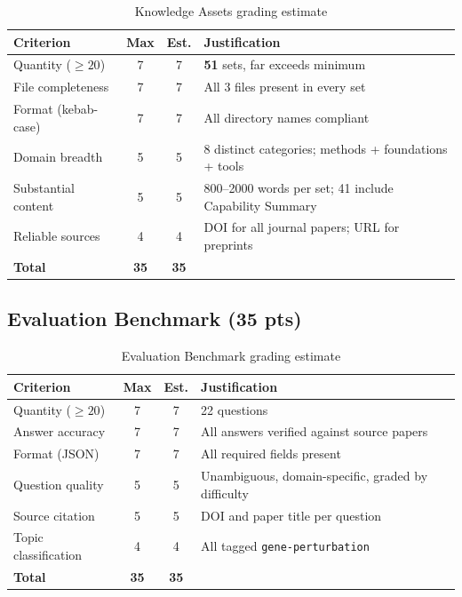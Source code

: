 \documentclass[12pt, a4paper]{article}
\begin{document}
\begin{table}[ht]
\centering
\caption{Knowledge Assets grading estimate}
\begin{tabular}{lccp{5cm}}
\toprule
\textbf{Criterion} & \textbf{Max} & \textbf{Est.} & \textbf{Justification} \\
\midrule
Quantity ($\ge20$)      & 7 & 7 & \textbf{51} sets, far exceeds minimum \\
File completeness       & 7 & 7 & All 3 files present in every set \\
Format (kebab-case)     & 7 & 7 & All directory names compliant \\
Domain breadth          & 5 & 5 & 8 distinct categories; methods + foundations + tools \\
Substantial content     & 5 & 5 & 800--2000 words per set; 41 include Capability Summary \\
Reliable sources        & 4 & 4 & DOI for all journal papers; URL for preprints \\
\midrule
\textbf{Total} & \textbf{35} & \textbf{35} & \\
\bottomrule
\end{tabular}
\end{table}

\subsection{Evaluation Benchmark (35 pts)}

\begin{table}[ht]
\centering
\caption{Evaluation Benchmark grading estimate}
\begin{tabular}{lccp{5cm}}
\toprule
\textbf{Criterion} & \textbf{Max} & \textbf{Est.} & \textbf{Justification} \\
\midrule
Quantity ($\ge20$)   & 7 & 7 & 22 questions \\
Answer accuracy      & 7 & 7 & All answers verified against source papers \\
Format (JSON)        & 7 & 7 & All required fields present \\
Question quality     & 5 & 5 & Unambiguous, domain-specific, graded by difficulty \\
Source citation      & 5 & 5 & DOI and paper title per question \\
Topic classification & 4 & 4 & All tagged \texttt{gene-perturbation} \\
\midrule
\textbf{Total} & \textbf{35} & \textbf{35} & \\
\bottomrule
\end{tabular}
\end{table}
\end{document}
